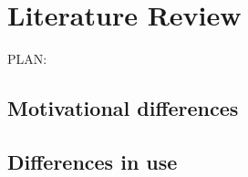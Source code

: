 \section{Literature Review}

PLAN:

\subsection{Motivational differences}

\subsection{Differences in use}